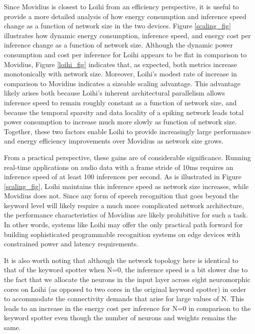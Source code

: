 \documentclass{article}
\begin{document}
Since Movidius is closest to Loihi from an efficiency perspective, it is useful to provide a more detailed analysis of how energy consumption and inference speed change as a function of network size in the two devices. Figure \ref{scaling_fig} illustrates how dynamic energy consumption, inference speed, and energy cost per inference change as a function of network size. Although the dynamic power consumption and cost per inference for Loihi appears to be flat in comparison to Movidius, Figure \ref{loihi_fig} indicates that, as expected, both metrics increase monotonically with network size. Moreover, Loihi's modest rate of increase in comparison to Movidius indicates a sizeable scaling advantage. This advantage likely arises both because Loihi's inherent architectural parallelism allows inference speed to remain roughly constant as a function of network size, and because the temporal sparsity and data locality of a spiking network leads total power consumption to increase much more slowly as function of network size. Together, these two factors enable Loihi to provide increasingly large performance and energy efficiency improvements over Movidius as network size grows. 

From a practical perspective, these gains are of considerable significance. Running real-time applications on audio data with a frame stride of 10ms requires an inference speed of at least 100 inferences per second. As is illustrated in Figure \ref{scaling_fig}, Loihi maintains this inference speed as network size increases, while Movidius does not. Since any form of speech recognition that goes beyond the keyword level will likely require a much more complicated network architecture, the performance characteristics of Movidius are likely prohibitive for such a task. In other words, systems like Loihi may offer the only practical path forward for building sophisticated programmable recognition systems on edge devices with constrained power and latency requirements.

It is also worth noting that although the network topology here is identical to that of the keyword spotter when N=0, the inference speed is a bit slower due to the fact that we allocate the neurons in the input layer across eight neuromorphic cores on Loihi (as opposed to two cores in the original keyword spotter) in order to accommodate the connectivity demands that arise for large values of N. This leads to an increase in the energy cost per inference for N=0 in comparison to the keyword spotter even though the number of neurons and weights remains the same. 
\end{document}

